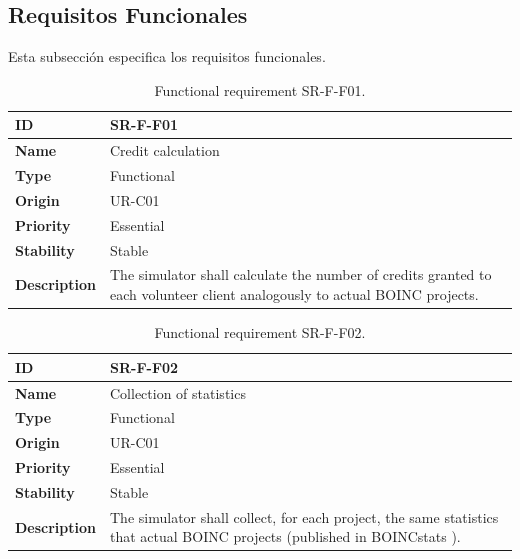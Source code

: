 \fi

\clearpage
\subsection{Requisitos Funcionales}

Esta subsección especifica los requisitos funcionales.

\iffalse

\begin{center}
\begin{table}[htbp]
\centering
\begin{tabular}{@{}p{2.5cm} p{9cm}@{}} 
\toprule
\textbf{ID} 				& SR-F-F01\\
\midrule
\textbf{Name} 			& Credit calculation \\
\midrule
\textbf{Type} 			& Functional \\
\midrule
\textbf{Origin} 			& UR-C01 \\
\midrule
\textbf{Priority}		& Essential \\
\midrule
\textbf{Stability} 		& Stable \\
\midrule
\textbf{Description} 	& The simulator shall calculate the number of credits granted to each volunteer client analogously to actual BOINC projects. \\
\bottomrule
\end{tabular}
\caption{Functional requirement SR-F-F01.}
\label{tab:srff01}
\end{table}
\end{center}

\begin{center}
\begin{table}[htbp]
\centering
\begin{tabular}{@{}p{2.5cm} p{9cm}@{}} 
\toprule
\textbf{ID} 				& SR-F-F02\\
\midrule
\textbf{Name} 			& Collection of statistics \\
\midrule
\textbf{Type} 			& Functional \\
\midrule
\textbf{Origin} 			& UR-C01 \\
\midrule
\textbf{Priority}		& Essential \\
\midrule
\textbf{Stability} 		& Stable \\
\midrule
\textbf{Description} 	& The simulator shall collect, for each project, the same statistics that actual BOINC projects (published in BOINCstats \cite{BOINC2016}). \\
\bottomrule
\end{tabular}
\caption{Functional requirement SR-F-F02.}
\label{tab:srff02}
\end{table}
\end{center}


